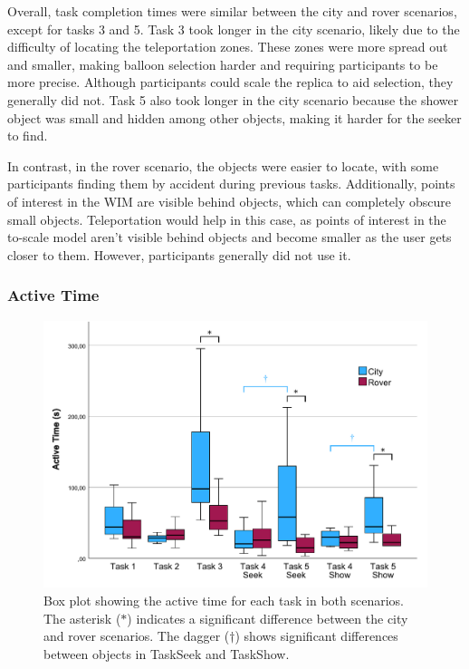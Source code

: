             Overall, task completion times were similar between the city and rover scenarios, except for tasks 3 and 5. Task 3 took longer in the city scenario, likely due to the difficulty of locating the teleportation zones. These zones were more spread out and smaller, making balloon selection harder and requiring participants to be more precise. Although participants could scale the replica to aid selection, they generally did not. Task 5 also took longer in the city scenario because the shower object was small and hidden among other objects, making it harder for the seeker to find. 
            
            In contrast, in the rover scenario, the objects were easier to locate, with some participants finding them by accident during previous tasks. Additionally, points of interest in the WIM are visible behind objects, which can completely obscure small objects. Teleportation would help in this case, as points of interest in the to-scale model aren't visible behind objects and become smaller as the user gets closer to them. However, participants generally did not use it.

        \subsubsection{Active Time}

   
            \begin{figure}[h!]
                \centering
                \includegraphics[width=1\linewidth]{figures/active_time_graph.pdf}
                \caption{Box plot showing the active time for each task in both scenarios. The asterisk ($\ast$) indicates a significant difference between the city and rover scenarios. The dagger ($\dag$)  shows significant differences between objects in TaskSeek and TaskShow.}
                \label{fig:active_time}
            \end{figure}

